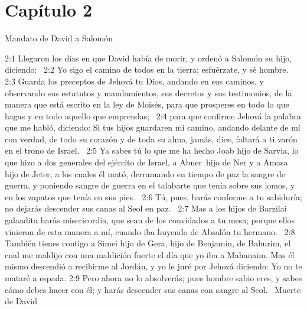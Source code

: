 \section*{Capítulo 2 }
Mandato de David a Salomón  

2:1 Llegaron los días en que David había de morir, y ordenó a Salomón su hijo, diciendo:  
2:2 Yo sigo el camino de todos en la tierra; esfuérzate, y sé hombre.  
2:3 Guarda los preceptos de Jehová tu Dios, andando en sus caminos, y observando sus estatutos y mandamientos, sus decretos y sus testimonios, de la manera que está escrito en la ley de Moisés, para que prosperes en todo lo que hagas y en todo aquello que emprendas;  
2:4 para que confirme Jehová la palabra que me habló, diciendo: Si tus hijos guardaren mi camino, andando delante de mí con verdad, de todo su corazón y de toda su alma, jamás, dice, faltará a ti varón en el trono de Israel.  
2:5 Ya sabes tú lo que me ha hecho Joab hijo de Sarvia, lo que hizo a dos generales del ejército de Israel, a Abner hijo de Ner y a Amasa hijo de Jeter, a los cuales él mató, derramando en tiempo de paz la sangre de guerra, y poniendo sangre de guerra en el talabarte que tenía sobre sus lomos, y en los zapatos que tenía en sus pies.  
2:6 Tú, pues, harás conforme a tu sabiduría; no dejarás descender sus canas al Seol en paz.  
2:7 Mas a los hijos de Barzilai galaadita harás misericordia, que sean de los convidados a tu mesa; porque ellos vinieron de esta manera a mí, cuando iba huyendo de Absalón tu hermano.  
2:8 También tienes contigo a Simei hijo de Gera, hijo de Benjamín, de Bahurim, el cual me maldijo con una maldición fuerte el día que yo iba a Mahanaim. Mas él mismo descendió a recibirme al Jordán, y yo le juré por Jehová diciendo: Yo no te mataré a espada. 
2:9 Pero ahora no lo absolverás; pues hombre sabio eres, y sabes cómo debes hacer con él; y harás descender sus canas con sangre al Seol.  
Muerte de David  

